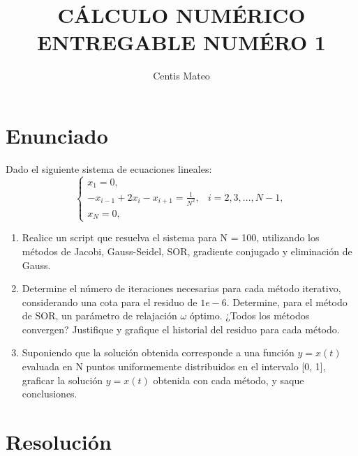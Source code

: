 \documentclass[10pt]{momento}
\title{CÁLCULO NUMÉRICO\\[0.5cm]
ENTREGABLE NUMÉRO 1}
\author{Centis Mateo}
\begin{document}
\maketitle

\section*{Enunciado}
Dado el siguiente sistema de ecuaciones lineales:
\begin{equation*}
  \left\{
  \begin{array}{ll}
    x_1=0,                                                \\
    -x_{i-1}+2x_i-x_{i+1}=\frac{1}{N^2}, & i=2,3,...,N-1, \\
    x_N=0,
  \end{array}
  \right.
\end{equation*}
\begin{enumerate}
  \renewcommand{\theenumi}{\alph{enumi}} %
  \item Realice un script que resuelva el sistema para N = 100, utilizando los métodos de Jacobi,
        Gauss-Seidel, SOR, gradiente conjugado y eliminación de Gauss.
  \item Determine el número de iteraciones necesarias para cada método iterativo, considerando una
        cota para el residuo de $1e-6$. Determine, para el método de SOR, un parámetro de relajación
        $\omega$ óptimo. ¿Todos los métodos convergen? Justifique y grafique el historial del residuo para
        cada método.
  \item Suponiendo que la solución obtenida corresponde a una función $y=x(t)$ evaluada en N puntos
        uniformemente distribuidos en el intervalo [0, 1], graficar la solución $y = x(t)$ obtenida con cada
        método, y saque conclusiones.
\end{enumerate}

\section*{Resolución}
\end{document}
